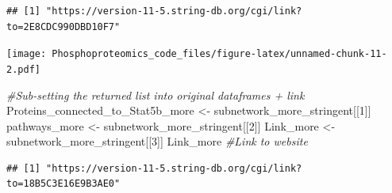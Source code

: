 \documentclass[
]{article}
\newenvironment{Shaded}{\begin{snugshade}}{\end{snugshade}}
\newcommand{\AttributeTok}[1]{\textcolor[rgb]{0.77,0.63,0.00}{#1}}
\newcommand{\CommentTok}[1]{\textcolor[rgb]{0.56,0.35,0.01}{\textit{#1}}}
\newcommand{\DecValTok}[1]{\textcolor[rgb]{0.00,0.00,0.81}{#1}}
\newcommand{\DocumentationTok}[1]{\textcolor[rgb]{0.56,0.35,0.01}{\textbf{\textit{#1}}}}
\newcommand{\FunctionTok}[1]{\textcolor[rgb]{0.00,0.00,0.00}{#1}}
\newcommand{\NormalTok}[1]{#1}
\newcommand{\OtherTok}[1]{\textcolor[rgb]{0.56,0.35,0.01}{#1}}
\newcommand{\SpecialCharTok}[1]{\textcolor[rgb]{0.00,0.00,0.00}{#1}}
\newcommand{\StringTok}[1]{\textcolor[rgb]{0.31,0.60,0.02}{#1}}
\begin{document}
\begin{verbatim}
## [1] "https://version-11-5.string-db.org/cgi/link?to=2E8CDC990DBD10F7"
\end{verbatim}

\begin{Shaded}
\end{Shaded}

\texttt{[image: Phosphoproteomics\_code\_files/figure-latex/unnamed-chunk-11-2.pdf]}

\begin{Shaded}
\begin{Highlighting}[]
\CommentTok{\#Sub{-}setting the returned list into original dataframes + link}
\NormalTok{Proteins\_connected\_to\_Stat5b\_more }\OtherTok{\textless{}{-}}\NormalTok{ subnetwork\_more\_stringent[[}\DecValTok{1}\NormalTok{]] }
\NormalTok{pathways\_more }\OtherTok{\textless{}{-}}\NormalTok{ subnetwork\_more\_stringent[[}\DecValTok{2}\NormalTok{]]}
\NormalTok{Link\_more }\OtherTok{\textless{}{-}}\NormalTok{ subnetwork\_more\_stringent[[}\DecValTok{3}\NormalTok{]]}
\NormalTok{Link\_more }\CommentTok{\#Link to website }
\end{Highlighting}
\end{Shaded}

\begin{verbatim}
## [1] "https://version-11-5.string-db.org/cgi/link?to=18B5C3E16E9B3AE0"
\end{verbatim}

\begin{Shaded}
\end{Shaded}
\end{document}
